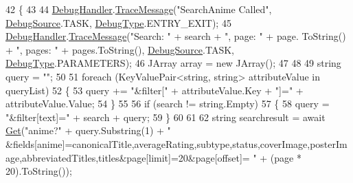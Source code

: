 \begin{DoxyCode}
42                                                                                                            
                                         \{
43 
44             \mbox{\hyperlink{class_little_weeb_library_1_1_handlers_1_1_kitsu_handler_a6d3c55fa5eee15320845c2d902c96882}{DebugHandler}}.\mbox{\hyperlink{interface_little_weeb_library_1_1_handlers_1_1_i_debug_handler_a2e405bc3492e683cd3702fae125221bc}{TraceMessage}}(\textcolor{stringliteral}{"SearchAnime Called"}, 
      \mbox{\hyperlink{namespace_little_weeb_library_1_1_handlers_a2a6ca0775121c9c503d58aa254d292be}{DebugSource}}.TASK, \mbox{\hyperlink{namespace_little_weeb_library_1_1_handlers_ab66019ed40462876ec4e61bb3ccb0a62}{DebugType}}.ENTRY\_EXIT);
45             \mbox{\hyperlink{class_little_weeb_library_1_1_handlers_1_1_kitsu_handler_a6d3c55fa5eee15320845c2d902c96882}{DebugHandler}}.\mbox{\hyperlink{interface_little_weeb_library_1_1_handlers_1_1_i_debug_handler_a2e405bc3492e683cd3702fae125221bc}{TraceMessage}}(\textcolor{stringliteral}{"Search: "} + search + \textcolor{stringliteral}{", page: "} + page.
      ToString() + \textcolor{stringliteral}{", pages: "} + pages.ToString(), \mbox{\hyperlink{namespace_little_weeb_library_1_1_handlers_a2a6ca0775121c9c503d58aa254d292be}{DebugSource}}.TASK, \mbox{\hyperlink{namespace_little_weeb_library_1_1_handlers_ab66019ed40462876ec4e61bb3ccb0a62}{DebugType}}.PARAMETERS);
46             JArray array = \textcolor{keyword}{new} JArray();
47             
48 
49             \textcolor{keywordtype}{string} query = \textcolor{stringliteral}{""};
50 
51             \textcolor{keywordflow}{foreach} (KeyValuePair<string, string> attributeValue \textcolor{keywordflow}{in} queryList)
52             \{
53                 query += \textcolor{stringliteral}{"&filter["} + attributeValue.Key + \textcolor{stringliteral}{"]="} + attributeValue.Value;
54             \}
55 
56             \textcolor{keywordflow}{if} (search != \textcolor{keywordtype}{string}.Empty)
57             \{
58                 query = \textcolor{stringliteral}{"&filter[text]="} + search + query;
59             \}
60 
61 
62             \textcolor{keywordtype}{string} searchresult = await \mbox{\hyperlink{class_little_weeb_library_1_1_handlers_1_1_kitsu_handler_a8b7c629a03096c3152252f6b5cf2937f}{Get}}(\textcolor{stringliteral}{"anime?"} + query.Substring(1) + \textcolor{stringliteral}{"
      &fields[anime]=canonicalTitle,averageRating,subtype,status,coverImage,posterImage,abbreviatedTitles,titles&page[limit]=20&page[offset]=
      "} + (page * 20).ToString());

\end{DoxyCode}
